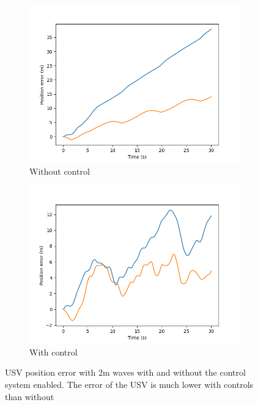 \documentclass[class=article, crop=false]{standalone}
\begin{document}
\begin{figure}
    \centering
    \begin{subfigure}{0.45\textwidth}
        \centering
        \includegraphics{scenario1/rov-50m/2.0m/usv_pos_error_uncontrolled}
        \caption{Without control}
    \end{subfigure}
    \hfill
    \begin{subfigure}{0.45\textwidth}
        \centering
        \includegraphics{scenario1/rov-50m/2.0m/usv_pos_error_controlled}
        \caption{With control}
    \end{subfigure}
    \caption{USV position error with 2m waves with and without the control system enabled. The error of the USV is much lower with controls than without}
    \label{fig:position_error_controlled_fucked}
\end{figure}
\end{document}
